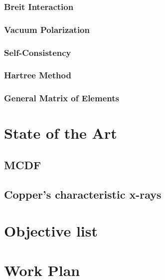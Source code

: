 \subsubsection{Breit Interaction}
\subsubsection{Vacuum Polarization}
\subsubsection{Self-Consistency}
\subsubsection{Hartree Method}
\subsubsection{General Matrix of Elements}



\section{State of the Art}

\subsection{MCDF}

\subsection{Copper's characteristic x-rays}

\section{Objective list}

\section{Work Plan}
